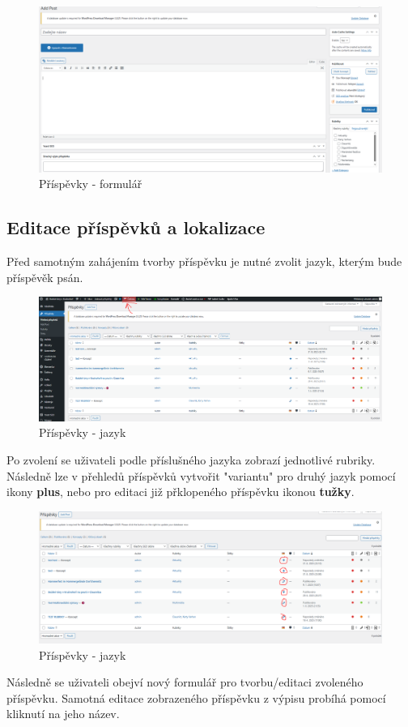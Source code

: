 \documentclass[12pt,a4paper]{article}
\begin{document}
	
	\newpage
	\begin{figure}[htp]
		\centering
		\includegraphics[width=15cm]{WPnewpost.png}
		\caption{Příspěvky - formulář}
		\label{fig:role}
	\end{figure}
	
	\subsection{Editace příspěvků a lokalizace}
	
		Před samotným zahájením tvorby příspěvku je nutné zvolit jazyk, kterým bude příspěvěk psán.
	
	\begin{figure}[htp]
		\centering
		\includegraphics[width=15cm]{WPprispevkylang.png}
		\caption{Příspěvky - jazyk}
		\label{fig:role}
	\end{figure}
	
	Po zvolení se uživateli podle příslušného jazyka zobrazí jednotlivé rubriky. Následně lze v přehledů příspěvků vytvořit "variantu" pro druhý jazyk pomocí ikony \textbf{plus}, nebo pro editaci již přklopeného příspěvku ikonou \textbf{tužky}.
	
	\begin{figure}[htp]
		\centering
		\includegraphics[width=15cm]{WPeditprispevek.png}
		\caption{Příspěvky - jazyk}
		\label{fig:role}
	\end{figure}
	
	\newpage
	Následně se uživateli obejví nový formulář pro tvorbu/editaci zvoleného příspěvku. Samotná editace zobrazeného příspěvku z výpisu probíhá pomocí kliknutí na jeho název.
	
	
	

	
	
	
	
	
	
	
	
	
	
\end{document}
